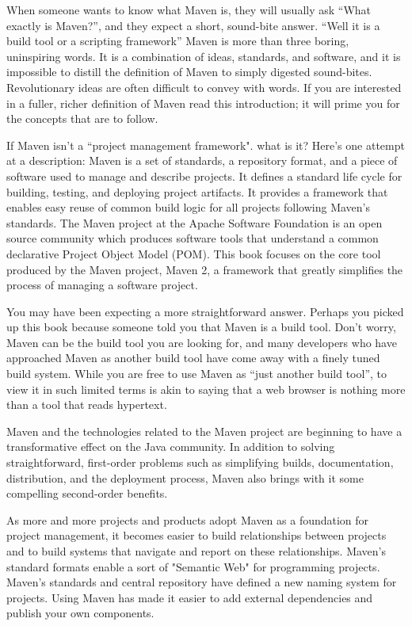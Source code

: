 \documentclass[a4paper,oneside]{article}
\begin{document}
When someone wants to know what Maven is, they will usually ask “What exactly is Maven?”, and they expect a short, sound-bite answer. “Well it is a build tool or a scripting framework” Maven is more than three boring, uninspiring words. It is a combination of ideas, standards, and software, and it is impossible to distill the definition of Maven to simply digested sound-bites. Revolutionary ideas are often difficult to convey with words. If you are interested in a fuller, richer definition of Maven read this introduction; it will prime you for the concepts that are to follow.


If Maven isn't a “project management framework". what is it? Here's one attempt at a description: Maven is a set of standards, a repository format, and a piece of software used to manage and describe projects. It defines a standard life cycle for building, testing, and deploying project artifacts. It provides a framework that enables easy reuse of common build logic for all projects following Maven's standards. The Maven project at the Apache Software Foundation is an open source community which produces software tools that understand a common declarative Project Object Model (POM). This book focuses on the core tool produced by the Maven project, Maven 2, a framework that greatly simplifies the process of managing a software project.


You may have been expecting a more straightforward answer. Perhaps you picked up this book because someone told you that Maven is a build tool. Don't worry, Maven can be the build tool you are looking for, and many developers who have approached Maven as another build tool have come away with a finely tuned build system. While you are free to use Maven as “just another build tool”, to view it in such limited terms is akin to saying that a web browser is nothing more than a tool that reads hypertext.


Maven and the technologies related to the Maven project are beginning to have a transformative effect on the Java community.
In addition to solving straightforward, first-order problems such as simplifying builds, documentation, distribution, and the deployment process, Maven also brings with it some compelling second-order benefits.


As more and more projects and products adopt Maven as a foundation for project management, it becomes easier to build relationships between projects and to build systems that navigate and report on these relationships. Maven's standard formats enable a sort of "Semantic Web" for programming projects. Maven's standards and central repository have defined a new naming system for projects. Using Maven has made it easier to add external dependencies and publish your own components.
\end{document}
